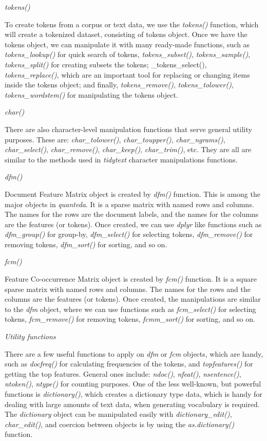 \documentclass[
]{article}
\begin{document}
\emph{tokens()}

To create tokens from a corpus or text data, we use the \emph{tokens()} function, which will create a tokenized dataset, consisting of tokens object. Once we have the tokens object, we can manipulate it with many ready-made functions, such as \emph{tokens\_lookup()} for quick search of tokens, \emph{tokens\_subset()}, \emph{tokens\_sample()}, \emph{tokens\_split()} for creating subsets the tokens; \_tokens\_select(), \emph{tokens\_replace()}, which are an important tool for replacing or changing items inside the tokens object; and finally, \emph{tokens\_remove()}, \emph{tokens\_tolower()}, \emph{tokens\_wordstem()} for manipulating the tokens object.

\emph{char()}

There are also character-level manipulation functions that serve general utility purposes. These are: \emph{char\_tolower()}, \emph{char\_toupper()}, \emph{char\_ngrams()}, \emph{char\_select()}, \emph{char\_remove()}, \emph{char\_keep()}, \emph{char\_trim()}, etc. They are all are similar to the methods used in \emph{tidytext} character manipulations functions.

\emph{dfm()}

Document Feature Matrix object is created by \emph{dfm()} function. This is among the major objects in \emph{quanteda}. It is a sparse matrix with named rows and columns. The names for the rows are the document labels, and the names for the columns are the features (or tokens). Once created, we can use \emph{dplyr} like functions such as \emph{dfm\_group()} for group-by, \emph{dfm\_select()} for selecting tokens, \emph{dfm\_remove()} for removing tokens, \emph{dfm\_sort()} for sorting, and so on.

\emph{fcm()}

Feature Co-occurrence Matrix object is created by \emph{fcm()} function. It is a square sparse matrix with named rows and columns. The names for the rows and the columns are the features (or tokens). Once created, the manipulations are similar to the \emph{dfm} object, where we can use functions such as \emph{fcm\_select()} for selecting tokens, \emph{fcm\_remove()} for removing tokens, \emph{fcmm\_sort()} for sorting, and so on.

\emph{Utility functions}

There are a few useful functions to apply on \emph{dfm} or \emph{fcm} objects, which are handy, such as \emph{docfreq()} for calculating frequencies of the tokens, and \emph{topfeatures()} for getting the top features. General ones include: \emph{ndoc()}, \emph{nfeat()}, \emph{nsentence()}, \emph{ntoken()}, \emph{ntype()} for counting purposes. One of the less well-known, but powerful functions is \emph{dictionary()}, which creates a dictionary type data, which is handy for dealing with large amounts of text data, when generating vocabulary is required. The \emph{dictionary} object can be manipulated easily with \emph{dictionary\_edit()}, \emph{char\_edit()}, and coercion between objects is by using the \emph{as.dictionary()} function.
\end{document}
